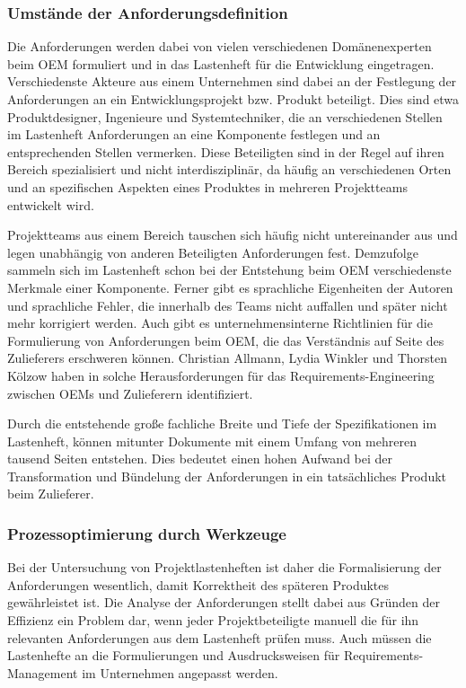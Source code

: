 \documentclass[12pt]{report}
\begin{document}
\subsubsection{Umstände der Anforderungsdefinition}
Die Anforderungen werden dabei von vielen verschiedenen Domänenexperten beim OEM formuliert und in das Lastenheft für die Entwicklung eingetragen. Verschiedenste Akteure aus einem Unternehmen sind dabei an der Festlegung der Anforderungen an ein Entwicklungsprojekt bzw. Produkt beteiligt. Dies sind etwa Produktdesigner, Ingenieure und Systemtechniker, die an verschiedenen Stellen im Lastenheft Anforderungen an eine Komponente festlegen und an entsprechenden Stellen vermerken. Diese Beteiligten sind in der Regel auf ihren Bereich spezialisiert und nicht interdisziplinär, da häufig an verschiedenen Orten und an spezifischen Aspekten eines Produktes in mehreren Projektteams entwickelt wird. 

Projektteams aus einem Bereich tauschen sich häufig nicht untereinander aus und legen unabhängig von anderen Beteiligten Anforderungen fest. Demzufolge sammeln sich im Lastenheft schon bei der Entstehung beim OEM verschiedenste Merkmale einer Komponente. Ferner gibt es sprachliche Eigenheiten der Autoren und sprachliche Fehler, die innerhalb des Teams nicht auffallen und später nicht mehr korrigiert werden. Auch gibt es unternehmensinterne Richtlinien für die Formulierung von Anforderungen beim OEM, die das Verständnis auf Seite des Zulieferers erschweren können. Christian Allmann, Lydia Winkler und Thorsten Kölzow haben in \cite{awk06} solche Herausforderungen für das Requirements-Engineering zwischen OEMs und Zulieferern identifiziert.

Durch die entstehende große fachliche Breite und Tiefe der Spezifikationen im Lastenheft, können mitunter Dokumente mit einem Umfang von mehreren tausend Seiten entstehen. Dies bedeutet einen hohen Aufwand bei der Transformation und Bündelung der Anforderungen in ein tatsächliches Produkt beim Zulieferer.  

\subsubsection{Prozessoptimierung durch Werkzeuge}
Bei der Untersuchung von Projektlastenheften ist daher die Formalisierung der Anforderungen wesentlich, damit Korrektheit des späteren Produktes gewährleistet ist. Die Analyse der Anforderungen stellt dabei aus Gründen der Effizienz ein Problem dar, wenn jeder Projektbeteiligte manuell die für ihn relevanten Anforderungen aus dem Lastenheft prüfen muss. Auch müssen die Lastenhefte an die Formulierungen und Ausdrucksweisen für Requirements-Management im Unternehmen angepasst werden. 
\end{document}
